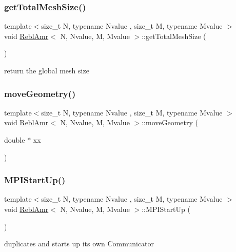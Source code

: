 \subsubsection{\texorpdfstring{get\+Total\+Mesh\+Size()}{getTotalMeshSize()}}
{\footnotesize\ttfamily template$<$size\+\_\+t N, typename Nvalue , size\+\_\+t M, typename Mvalue $>$ \\
void \mbox{\hyperlink{classReblAmr}{Rebl\+Amr}}$<$ N, Nvalue, M, Mvalue $>$\+::get\+Total\+Mesh\+Size (\begin{DoxyParamCaption}{ }\end{DoxyParamCaption})}

return the global mesh size \mbox{\label{classReblAmr_ab35c58d7ff40251f6021688172eda329}} 
\subsubsection{\texorpdfstring{move\+Geometry()}{moveGeometry()}}
{\footnotesize\ttfamily template$<$size\+\_\+t N, typename Nvalue , size\+\_\+t M, typename Mvalue $>$ \\
void \mbox{\hyperlink{classReblAmr}{Rebl\+Amr}}$<$ N, Nvalue, M, Mvalue $>$\+::move\+Geometry (\begin{DoxyParamCaption}\item[{double $\ast$}]{xx }\end{DoxyParamCaption})}

\mbox{\label{classReblAmr_a432a0fbbe5961e5bc972360c3bc28dce}} 
\subsubsection{\texorpdfstring{M\+P\+I\+Start\+Up()}{MPIStartUp()}}
{\footnotesize\ttfamily template$<$size\+\_\+t N, typename Nvalue , size\+\_\+t M, typename Mvalue $>$ \\
void \mbox{\hyperlink{classReblAmr}{Rebl\+Amr}}$<$ N, Nvalue, M, Mvalue $>$\+::M\+P\+I\+Start\+Up (\begin{DoxyParamCaption}{ }\end{DoxyParamCaption})}

duplicates and starts up its own Communicator \mbox{\label{classReblAmr_aaa3c7e59843ba6603e848c2406385fc9}} 
